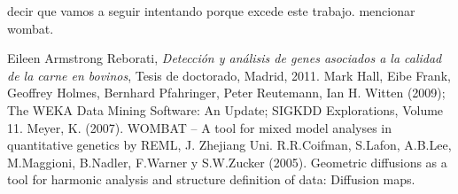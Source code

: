 \documentclass[12pt,a4paper,titlepage]{report}
\begin{document}
decir que vamos a seguir intentando porque excede este trabajo. mencionar wombat.



\begin{thebibliography}{99}
\begin{small}

Eileen Armstrong Reborati, \emph{Detección y análisis de genes asociados a la calidad de la carne en bovinos}, Tesis de doctorado, Madrid, 2011.
Mark Hall, Eibe Frank, Geoffrey Holmes, Bernhard Pfahringer, Peter Reutemann, Ian H. Witten (2009); The WEKA Data Mining Software: An Update; SIGKDD Explorations, Volume 11.
Meyer, K. (2007). WOMBAT – A tool for mixed model analyses in quantitative genetics by REML, J. Zhejiang Uni.
R.R.Coifman, S.Lafon, A.B.Lee, M.Maggioni, B.Nadler, F.Warner y S.W.Zucker (2005). Geometric diffusions as a tool for harmonic analysis and structure definition of data: Diffusion maps.

\end{small}
\end{thebibliography}
\end{document}
